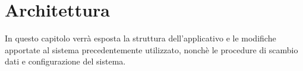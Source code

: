 \chapter{Architettura}
\label{ch:architettura}
In questo capitolo verrà esposta la struttura dell'applicativo e le modifiche apportate al sistema precedentemente utilizzato, nonchè le procedure di scambio dati e configurazione del sistema.







